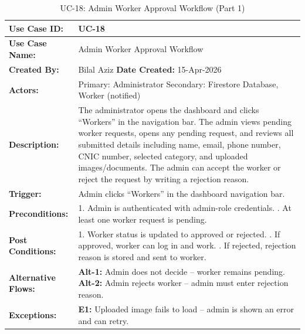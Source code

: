 {\small
\renewcommand{\arraystretch}{1.05}
\begin{table}[H]
\centering
\begin{tabular}{|p{3cm}|p{11.2cm}|}
\hline
\textbf{Use Case ID:} & UC-18 \\ \hline
\textbf{Use Case Name:} & Admin Worker Approval Workflow \\ \hline
\textbf{Created By:} & Bilal Aziz \hfill \textbf{Date Created:} 15-Apr-2026 \\ \hline
\textbf{Actors:} & Primary: Administrator \quad Secondary: Firestore Database, Worker (notified) \\ \hline
\textbf{Description:} & The administrator opens the dashboard and clicks ``Workers'' in the navigation bar. The admin views pending worker requests, opens any pending request, and reviews all submitted details including name, email, phone number, CNIC number, selected category, and uploaded images/documents. The admin can accept the worker or reject the request by writing a rejection reason. \\ \hline
\textbf{Trigger:} & Admin clicks ``Workers'' in the dashboard navigation bar. \\ \hline
\textbf{Preconditions:} & 1. Admin is authenticated with admin-role credentials. \newline 2. At least one worker request is pending. \\ \hline
\textbf{Post Conditions:} & 1. Worker status is updated to approved or rejected. \newline 2. If approved, worker can log in and work. \newline 3. If rejected, rejection reason is stored and sent to worker. \\ \hline
\textbf{Alternative Flows:} & \textbf{Alt-1:} Admin does not decide -- worker remains pending. \newline \textbf{Alt-2:} Admin rejects worker -- admin must enter rejection reason. \\ \hline
\textbf{Exceptions:} & \textbf{E1:} Uploaded image fails to load -- admin is shown an error and can retry. \\ \hline
\end{tabular}
\caption*{UC-18: Admin Worker Approval Workflow (Part 1)}
\end{table}
}

\newpage

